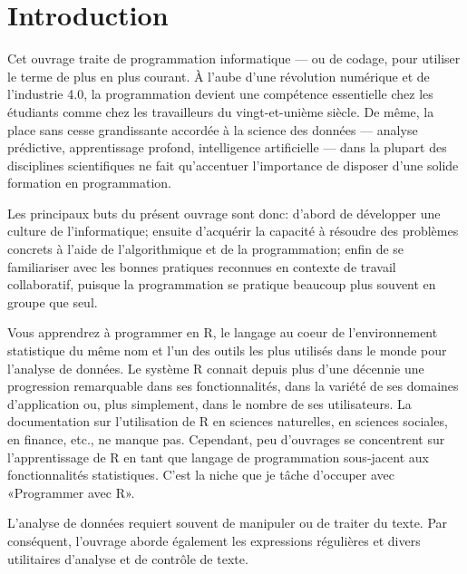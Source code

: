
\chapter{Introduction}

Cet ouvrage traite de programmation informatique --- ou de codage,
pour utiliser le terme de plus en plus courant. À l'aube d'une
révolution numérique et de l'industrie 4.0, la programmation devient
une compétence essentielle chez les étudiants comme chez les
travailleurs du vingt-et-unième siècle. De même, la place sans cesse
grandissante accordée à la science des données --- analyse prédictive,
apprentissage profond, intelligence artificielle --- dans la plupart
des disciplines scientifiques ne fait qu'accentuer l'importance de
disposer d'une solide formation en programmation.

Les principaux buts du présent ouvrage sont donc: d'abord de
développer une culture de l'informatique; ensuite d'acquérir la
capacité à résoudre des problèmes concrets à l'aide de l'algorithmique
et de la programmation; enfin de se familiariser avec les bonnes
pratiques reconnues en contexte de travail collaboratif, puisque la
programmation se pratique beaucoup plus souvent en groupe que seul.

Vous apprendrez à programmer en R, le langage au coeur de
l'environnement statistique du même nom et l'un des outils les plus
utilisés dans le monde pour l'analyse de données. Le système R connait
depuis plus d'une décennie une progression remarquable dans ses
fonctionnalités, dans la variété de ses domaines d'application ou,
plus simplement, dans le nombre de ses utilisateurs. La documentation
sur l'utilisation de R en sciences naturelles, en sciences sociales,
en finance, etc., ne manque pas. Cependant, peu d'ouvrages se
concentrent sur l'apprentissage de R en tant que langage de
programmation sous-jacent aux fonctionnalités statistiques. C'est la
niche que je tâche d'occuper avec «Programmer avec R».

L'analyse de données requiert souvent de manipuler ou de traiter du
texte. Par conséquent, l'ouvrage aborde également les expressions
régulières et divers utilitaires d'analyse et de contrôle de texte.

